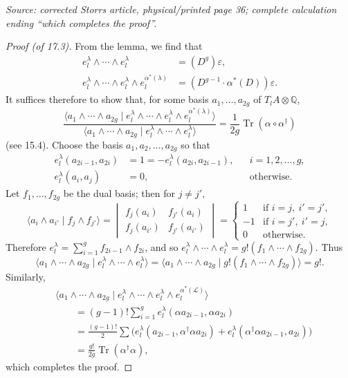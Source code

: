 \documentclass[11pt]{article}
\DeclareMathOperator{\AVTr}{Tr}
\newcommand{\AVQ}{\mathbb{Q}}
\newcommand{\AVsrc}[1]{\par\smallskip\noindent\textit{Source: #1.}\par\smallskip}
\begin{document}
\AVsrc{corrected Storrs article, physical/printed page 36; complete calculation ending ``which completes the proof''}
\begin{proof}[Proof (of 17.3)]
From the lemma, we find that
\begin{align*}
e_l^{\lambda}\wedge\cdots\wedge e_l^{\lambda}
&=(D^g)\varepsilon,\\
e_l^{\lambda}\wedge\cdots\wedge e_l^{\lambda}
\wedge e_l^{\alpha^*(\lambda)}
&=(D^{g-1}\cdot\alpha^*(D))\varepsilon.
\end{align*}
It suffices therefore to show that, for some basis $a_1,\ldots,a_{2g}$
of $T_l A\otimes\AVQ$,
\[
\frac{\langle a_1\wedge\cdots\wedge a_{2g}\mid
e_l^{\lambda}\wedge\cdots\wedge e_l^{\lambda}
\wedge e_l^{\alpha^*(\lambda)}\rangle}
{\langle a_1\wedge\cdots\wedge a_{2g}\mid
e_l^{\lambda}\wedge\cdots\wedge e_l^{\lambda}\rangle}
=\frac{1}{2g}\AVTr(\alpha\circ\alpha^{\dagger})
\]
(see 15.4). Choose the basis $a_1,a_2,\ldots,a_{2g}$ so that
\begin{align*}
e_l^{\lambda}(a_{2i-1},a_{2i})
&=1=-e_l^{\lambda}(a_{2i},a_{2i-1}),
&&i=1,2,\ldots,g,\\
e_l^{\lambda}(a_i,a_j)&=0,&&\text{otherwise}.
\end{align*}
Let $f_1,\ldots,f_{2g}$ be the dual basis; then for $j\ne j'$,
\[
\langle a_i\wedge a_{i'}\mid f_j\wedge f_{j'}\rangle
=\begin{vmatrix}
f_j(a_i)&f_{j'}(a_i)\\
f_j(a_{i'})&f_{j'}(a_{i'})
\end{vmatrix}
=\begin{cases}
1&\text{if }i=j,\ i'=j',\\
-1&\text{if }i=j',\ i'=j,\\
0&\text{otherwise}.
\end{cases}
\]
Therefore $e_l^{\lambda}=\sum_{i=1}^g f_{2i-1}\wedge f_{2i}$, and so
$e_l^{\lambda}\wedge\cdots\wedge e_l^{\lambda}
=g!(f_1\wedge\cdots\wedge f_{2g})$. Thus
\[
\langle a_1\wedge\cdots\wedge a_{2g}\mid
e_l^{\lambda}\wedge\cdots\wedge e_l^{\lambda}\rangle
=\langle a_1\wedge\cdots\wedge a_{2g}\mid
g!(f_1\wedge\cdots\wedge f_{2g})\rangle=g!.
\]
Similarly,
\begin{align*}
&\langle a_1\wedge\cdots\wedge a_{2g}\mid
e_l^{\lambda}\wedge\cdots\wedge e_l^{\lambda}
\wedge e_l^{\alpha^*(\mathcal L)}\rangle\\
&\qquad=(g-1)!\sum_{i=1}^g
e_l^{\lambda}(\alpha a_{2i-1},\alpha a_{2i})\\
&\qquad=\frac{(g-1)!}{2}\sum
\bigl(e_l^{\lambda}(a_{2i-1},\alpha^{\dagger}\alpha a_{2i})
+e_l^{\lambda}(\alpha^{\dagger}\alpha a_{2i-1},a_{2i})\bigr)\\
&\qquad=\frac{g!}{2g}\AVTr(\alpha^{\dagger}\alpha),
\end{align*}
which completes the proof.
\end{proof}
\end{document}
